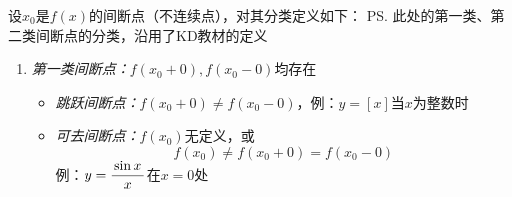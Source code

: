 设$x_0$是$f(x)$的间断点（不连续点），对其分类定义如下：
\ps{此处的第一类、第二类间断点的分类，沿用了KD教材的定义}
\begin{enumerate}[(1)]
  \setlength{\itemindent}{1cm}
  \item {\it 第一类间断点：}$f(x_0+0),f(x_0-0)$均存在
  \begin{itemize}
    \item {\it 跳跃间断点：}$f(x_0+0)\ne f(x_0-0)$，例：$y=[x]$当$x$为整数时
    \begin{center}
 	\end{center}
    \item {\it 可去间断点：}$f(x_0)$无定义，或
    $$f(x_0)\ne f(x_0+0)=f(x_0-0)$$
    例：$y=\displaystyle\frac{\,{\sin x}\,}{\,{x}\,}$在$x=0$处
    \begin{center}
 	\end{center}
  \end{itemize}

\end{enumerate}
